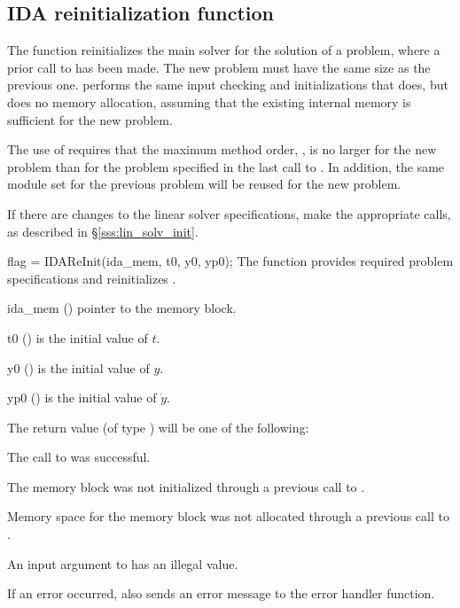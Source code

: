 {%

\subsection{IDA reinitialization function}\label{sss:idareinit}

The function  reinitializes the main {\ida} solver for
the solution of a problem, where a prior call to  has
been made. The new problem must have the same size as the previous one.
 performs the same input checking and initializations 
that  does, but does no memory allocation, assuming that the 
existing internal memory is sufficient for the new problem.             
                                                                 
The use of  requires that the maximum method order,    
, is no larger for the new problem than for the problem  
specified in the last call to .  In addition, the same
{\nvector} module set for the previous problem
will be reused for the new problem.

If there are changes to the linear solver specifications, make the
appropriate  calls, as described in \S\ref{sss:lin_solv_init}.

{
  flag = IDAReInit(ida\_mem, t0, y0, yp0);
}
{
  The function  provides required problem specifications 
  and reinitializes {\ida}.
}
{
  \begin{args}
  \item[ida\_mem] ()
    pointer to the {\ida} memory block.
  \item[t0] ()
    is the initial value of $t$.
  \item[y0] ()
    is the initial value of $y$. 
  \item[yp0] ()
    is the initial value of $\dot{y}$.   
  \end{args}
}
{
  The return value  (of type ) will be one of the following:
  \begin{args}
  \item[\Id{IDA\_SUCCESS}]
    The call to  was successful.
  \item[\Id{IDA\_MEM\_NULL}] 
    The {\ida} memory block was not initialized through a 
    previous call to .
  \item[\Id{IDA\_NO\_MALLOC}] 
    Memory space for the {\ida} memory block was not allocated through a 
    previous call to .
  \item[\Id{IDA\_ILL\_INPUT}] 
    An input argument to  has an illegal value.
  \end{args}
}
{
  If an error occurred,  also sends an error message to the
  error handler function.
}


}

